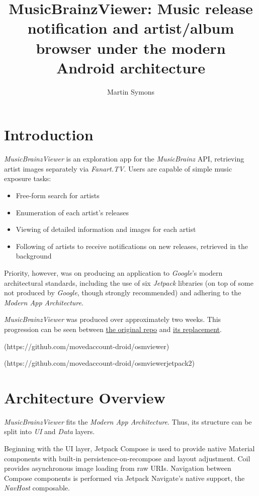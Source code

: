 \documentclass[]{article}
\title{MusicBrainzViewer: Music release notification and artist/album browser under the modern Android architecture}
\author{Martin Symons}
\begin{document}
\maketitle

\section{Introduction}
\textit{MusicBrainzViewer} is an exploration app for the \textit{MusicBrainz} API, retrieving artist images separately via \textit{Fanart.TV}. Users are capable of simple music exposure tasks:

\begin{itemize}
	\item Free-form search for artists
	\item Enumeration of each artist's releases
	\item Viewing of detailed information and images for each artist
	\item Following of artists to receive notifications on new releases, retrieved in the background
\end{itemize}

Priority, however, was on producing an application to \textit{Google}'s modern architectural standards, including the use of six \textit{Jetpack} libraries (on top of some not produced by \textit{Google}, though strongly recommended) and adhering to the \textit{Modern App Architecture}.

\textit{MusicBrainzViewer} was produced over approximately two weeks. This progression can be seen between \href{https://github.com/movedaccount-droid/osmviewer}{the original repo} and \href{https://github.com/movedaccount-droid/osmviewerjetpack2}{its replacement}.

(https://github.com/movedaccount-droid/osmviewer)

(https://github.com/movedaccount-droid/osmviewerjetpack2)

\section{Architecture Overview}
\textit{MusicBrainzViewer} fits the \textit{Modern App Architecture}. Thus, its structure can be split into \textit{UI} and \textit{Data} layers.

Beginning with the UI layer, Jetpack Compose is used to provide native Material components with built-in persistence-on-recompose and layout adjustment. Coil provides asynchronous image loading from raw URIs. Navigation between Compose components is performed via Jetpack Navigate's native support, the \textit{NavHost} composable.
\end{document}
